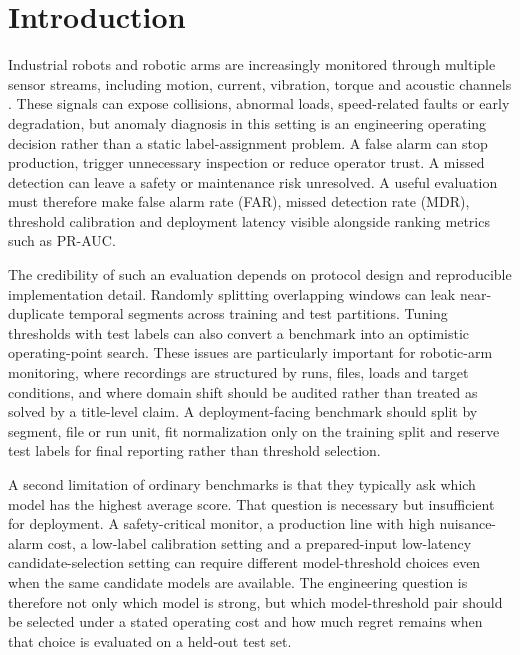 \section{Introduction}

Industrial robots and robotic arms are increasingly monitored through multiple sensor streams, including motion, current, vibration, torque and acoustic channels \cite{Chandola2009Survey,Pimentel2014NoveltyDetection,BlazquezGarcia2021TimeSeriesSurvey,Narayanan2018IndustrialArm}. These signals can expose collisions, abnormal loads, speed-related faults or early degradation, but anomaly diagnosis in this setting is an engineering operating decision rather than a static label-assignment problem. A false alarm can stop production, trigger unnecessary inspection or reduce operator trust. A missed detection can leave a safety or maintenance risk unresolved. A useful evaluation must therefore make false alarm rate (FAR), missed detection rate (MDR), threshold calibration and deployment latency visible alongside ranking metrics such as PR-AUC.

The credibility of such an evaluation depends on protocol design and reproducible implementation detail. Randomly splitting overlapping windows can leak near-duplicate temporal segments across training and test partitions. Tuning thresholds with test labels can also convert a benchmark into an optimistic operating-point search. These issues are particularly important for robotic-arm monitoring, where recordings are structured by runs, files, loads and target conditions, and where domain shift should be audited rather than treated as solved by a title-level claim. A deployment-facing benchmark should split by segment, file or run unit, fit normalization only on the training split and reserve test labels for final reporting rather than threshold selection.

A second limitation of ordinary benchmarks is that they typically ask which model has the highest average score. That question is necessary but insufficient for deployment. A safety-critical monitor, a production line with high nuisance-alarm cost, a low-label calibration setting and a prepared-input low-latency candidate-selection setting can require different model-threshold choices even when the same candidate models are available. The engineering question is therefore not only which model is strong, but which model-threshold pair should be selected under a stated operating cost and how much regret remains when that choice is evaluated on a held-out test set.

